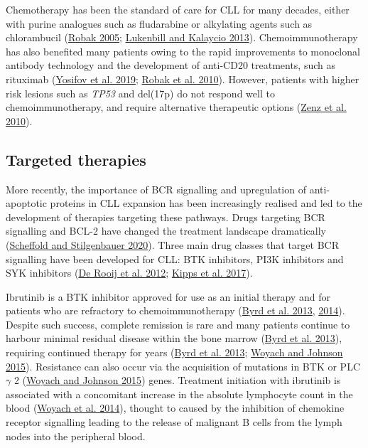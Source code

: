 \documentclass[11pt, a4paper, twosided]{book}
\begin{document}
Chemotherapy has been the standard of care for CLL for many decades, either with purine analogues such as fludarabine or alkylating agents such as chlorambucil (\protect\hyperlink{ref-Robak2005}{Robak 2005}; \protect\hyperlink{ref-Lukenbill2013}{Lukenbill and Kalaycio 2013}). Chemoimmunotherapy has also benefited many patients owing to the rapid improvements to monoclonal antibody technology and the development of anti-CD20 treatments, such as rituximab (\protect\hyperlink{ref-Yosifov2019}{Yosifov et al. 2019}; \protect\hyperlink{ref-Robak2010}{Robak et al. 2010}). However, patients with higher risk lesions such as \emph{TP53} and del(17p) do not respond well to chemoimmunotherapy, and require alternative therapeutic options (\protect\hyperlink{ref-Zenz2010}{Zenz et al. 2010}).

\hypertarget{intro-targeted-therapies}{%
\subsection{Targeted therapies}\label{intro-targeted-therapies}}

More recently, the importance of BCR signalling and upregulation of anti-apoptotic proteins in CLL expansion has been increasingly realised and led to the development of therapies targeting these pathways. Drugs targeting BCR signalling and BCL-2 have changed the treatment landscape dramatically (\protect\hyperlink{ref-Scheffold2020}{Scheffold and Stilgenbauer 2020}). Three main drug classes that target BCR signalling have been developed for CLL: BTK inhibitors, PI3K inhibitors and SYK inhibitors (\protect\hyperlink{ref-Rooij2012}{De Rooij et al. 2012}; \protect\hyperlink{ref-Kipps2017}{Kipps et al. 2017}).

Ibrutinib is a BTK inhibitor approved for use as an initial therapy and for patients who are refractory to chemoimmunotherapy (\protect\hyperlink{ref-Byrd2013}{Byrd et al. 2013}, \protect\hyperlink{ref-Byrd2014}{2014}). Despite such success, complete remission is rare and many patients continue to harbour minimal residual disease within the bone marrow (\protect\hyperlink{ref-Byrd2013}{Byrd et al. 2013}), requiring continued therapy for years (\protect\hyperlink{ref-Byrd2013}{Byrd et al. 2013}; \protect\hyperlink{ref-Woyach2015}{Woyach and Johnson 2015}). Resistance can also occur via the acquisition of mutations in BTK or PLC\(\gamma\) 2 (\protect\hyperlink{ref-Woyach2015}{Woyach and Johnson 2015}) genes. Treatment initiation with ibrutinib is associated with a concomitant increase in the absolute lymphocyte count in the blood (\protect\hyperlink{ref-Woyach2014}{Woyach et al. 2014}), thought to caused by the inhibition of chemokine receptor signalling leading to the release of malignant B cells from the lymph nodes into the peripheral blood.
\end{document}
